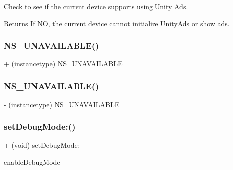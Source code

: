 Check to see if the current device supports using Unity Ads.

\begin{DoxyReturn}{Returns}
If {\ttfamily NO}, the current device cannot initialize {\ttfamily \mbox{\hyperlink{interface_unity_ads}{Unity\+Ads}}} or show ads. 
\end{DoxyReturn}
\mbox{\label{interface_unity_ads_a5e5d2f9d0967ae24896451e0fa1d7d05}} 
\subsubsection{\texorpdfstring{NS\_UNAVAILABLE()}{NS\_UNAVAILABLE()}\hspace{0.1cm}{\footnotesize\ttfamily [1/2]}}
{\footnotesize\ttfamily + (instancetype) N\+S\+\_\+\+U\+N\+A\+V\+A\+I\+L\+A\+B\+LE \begin{DoxyParamCaption}{ }\end{DoxyParamCaption}}

\mbox{\label{interface_unity_ads_a5e5d2f9d0967ae24896451e0fa1d7d05}} 
\subsubsection{\texorpdfstring{NS\_UNAVAILABLE()}{NS\_UNAVAILABLE()}\hspace{0.1cm}{\footnotesize\ttfamily [2/2]}}
{\footnotesize\ttfamily -\/ (instancetype) N\+S\+\_\+\+U\+N\+A\+V\+A\+I\+L\+A\+B\+LE \begin{DoxyParamCaption}{ }\end{DoxyParamCaption}}

\mbox{\label{interface_unity_ads_a8fb72943aa227334bf7219725ef8eb5b}} 
\subsubsection{\texorpdfstring{setDebugMode:()}{setDebugMode:()}}
{\footnotesize\ttfamily + (void) set\+Debug\+Mode\+: \begin{DoxyParamCaption}\item[{(B\+O\+OL)}]{enable\+Debug\+Mode }\end{DoxyParamCaption}}


